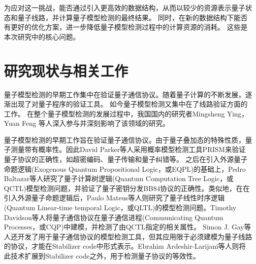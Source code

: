 为应对这一挑战，能否通过引入更高效的数据结构，从而以较少的资源表示量子状态和量子线路，并计算量子模型检测的最终结果。
同时，在新的数据结构下能否有更好的优化方案，进一步降低量子模型检测过程中的计算资源的消耗。
这些是本次研究中的核心问题。
\section{研究现状与相关工作}
量子模型检测的早期工作集中在验证量子通信协议。随着量子计算的不断发展，逐渐出现了对量子程序的验证工具。
如今量子模型检测又集中在了线路验证方面的工作。
在整个量子模型检测的发展过程中，我国国内的研究者Mingsheng Ying， Yuan Feng 等人深入参与并深刻影响了该领域的研究。

量子模型检测的早期工作旨在验证量子通信协议。由于量子叠加态的特殊性质，量子测量带有概率性。因此David Parker等人采用概率模型检测工具PRISM\citep{kwiatkowska2004probabilistic}来验证量子协议的正确性，如超密编码、量子传输和量子纠错等。
之后在引入外源量子命题逻辑(Exogenous Quantum Propositional Logic，或EQPL)\citep{mateus2006weakly}的基础上，Pedro Baltazar等人研究了量子计算树逻辑(Quantum Computation Tree Logic，或QCTL)模型检测问题，并验证了量子密钥分发BB84协议\citep{bennett2014quantum}的正确性\citep{baltazar2008quantum,baltazar2007towards}。类似地，在在引入外源量子命题逻辑后，Paulo Mateus等人则研究了量子线性时序逻辑(Quantum Linear-time temporal Logic，或QLTL)的模型检测问题\citep{mateus2009temporal}。Timothy Davidson等人将量子通信协议在量子通信进程(Communicating Quantum Processes，或CQP)\citep{gay2005communicating}中建模，并检测了由QCTL指定的相关属性\citep{davidson2012formal,davidson2012model}。
Simon J. Gay等人还开发了用于量子通信协议的模型检测工具\citep{Gay,gay2010specification}，但其应用限于必须建模为量子线路的协议，才能在Stabilizer code\citep{gottesman1997stabilizer}中形式表示。Ebrahim Ardeshir-Larijani等人则将此技术扩展到Stabilizer code之外，用于检测量子协议的等效性\citep{ardeshir2013equivalence,ardeshir2014verification}。

